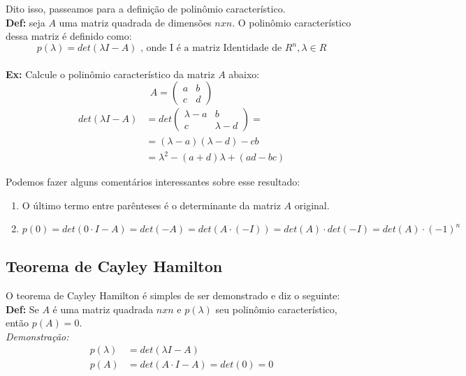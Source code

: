 \documentclass[12pt]{article}
\begin{document}
	Dito isso, passeamos para a definição de polinômio característico.\\
	
	\textbf{Def:} seja $A$ uma matriz quadrada de dimensões $nxn$. O polinômio característico dessa matriz é definido como:
	\begin{equation*}
		p(\lambda)=det(\lambda I-A)\mbox{ , onde I é a matriz Identidade de }R^n, \lambda \in R
	\end{equation*}\\
	
	\textbf{Ex:} Calcule o polinômio característico da matriz $A$ abaixo:
	\begin{equation*}
		A=\begin{pmatrix}
			a&b\\
			c&d
		\end{pmatrix}
	\end{equation*}
	\begin{align*}
		det(\lambda I-A)&=det
		\begin{pmatrix}
			\lambda-a&b\\
			c&\lambda-d
		\end{pmatrix}=\\
		&= (\lambda-a)(\lambda-d)-cb\\
		&= \lambda^2 -(a+d)\lambda+(ad-bc)
	\end{align*}
	
	Podemos fazer alguns comentários interessantes sobre esse resultado:
	\begin{enumerate}
		\item O último termo entre parênteses é o determinante da matriz $A$ original.
		\item $p(0)=det(0\cdot I-A)=det(-A)=det(A\cdot(-I))=det(A)\cdot det(-I)=det(A)\cdot(-1)^n$
	\end{enumerate}
	
	\subsection{Teorema de Cayley Hamilton}
	
	O teorema de Cayley Hamilton é simples de ser demonstrado e diz o seguinte:\\
	
	\textbf{Def:} Se $A$ é uma matriz quadrada $nxn$ e $p(\lambda)$ seu polinômio característico, então $p(A)=0$.\\
	
	\textit{Demonstração:}
	\begin{align*}
		p(\lambda)&=det(\lambda I-A)\\
		p(A)&=det(A\cdot I-A)=det(0)=0
	\end{align*}
	
\end{document}
